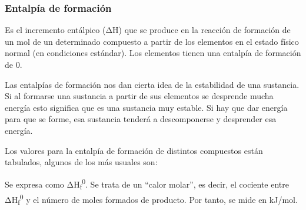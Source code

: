 \documentclass[
  spanish,
]{article}
\begin{document}
\hypertarget{entalpuxeda-de-formaciuxf3n}{%
\subsubsection{Entalpía de
formación}\label{entalpuxeda-de-formaciuxf3n}}

Es el incremento entálpico (ΔH) que se produce en la reacción de
formación de un mol de un determinado compuesto a partir de los
elementos en el estado físico normal (en condiciones estándar). Los
elementos tienen una entalpía de formación de 0.

Las entalpías de formación nos dan cierta idea de la estabilidad de una
sustancia. Si al formarse una sustancia a partir de sus elementos se
desprende mucha energía esto significa que es una sustancia muy estable.
Si hay que dar energía para que se forme, esa sustancia tenderá a
descomponerse y desprender esa energía.

Los valores para la entalpía de formación de distintos compuestos están
tabulados, algunos de los más usuales son:

\hfill{}

Se expresa como ΔH\textsubscript{f}\textsuperscript{0}. Se trata de un
``calor molar'', es decir, el cociente entre
ΔH\textsubscript{f}\textsuperscript{0} y el número de moles formados de
producto. Por tanto, se mide en kJ/mol.
\end{document}
